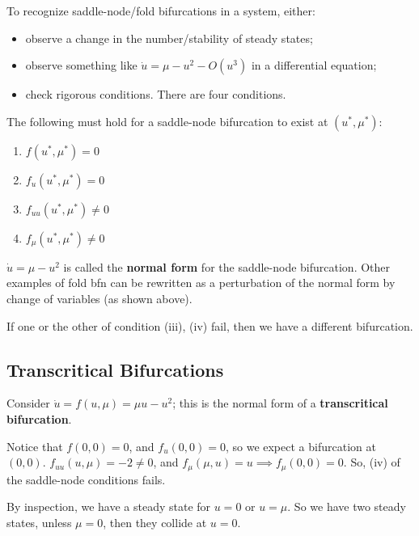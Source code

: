 \documentclass[12pt, oneside]{article}
\begin{document}
To recognize saddle-node/fold bifurcations in a system, either:

\begin{itemize}
  \item observe a change in the number/stability of steady states; %
  \item observe something like $\dot{u} = \mu - u^2 - O(u^3)$ in a differential equation;
  \item check rigorous conditions. There are four conditions.
\end{itemize}

\begin{definition}
  The following must hold for a saddle-node bifurcation to exist at $(u^*, \mu^*)$:
  \begin{enumerate}[label=\roman*)]
    \item $f(u^*, \mu^*) = 0$
    \item $f_u(u^*, \mu^*) = 0$
    \item $f_{uu}(u^*, \mu^*) \neq 0$
    \item $f_\mu(u^*, \mu^*) \neq 0$
  \end{enumerate}  
\end{definition}

\begin{remark}
  $\dot{u} = \mu - u^2$ is called the \textbf{normal form} for the saddle-node bifurcation. Other examples of fold bfn can be rewritten as a perturbation of the normal form by change of variables (as shown above).
\end{remark}

If one or the other of condition (iii), (iv) fail, then we have a different bifurcation.

\subsection{Transcritical Bifurcations}

Consider $\dot{u} = f(u,\mu) = \mu u - u^2$; this is the normal form of a \textbf{transcritical bifurcation}.

Notice that $f(0,0) = 0$, and $f_u(0,0) = 0$, so we expect a bifurcation at $(0,0)$. $f_{uu}(u, \mu) = -2 \neq 0$, and $f_{\mu}(\mu, u) = u \implies f_{\mu}(0,0) = 0$. So, (iv) of the saddle-node conditions fails.

By inspection, we have a steady state for $u = 0$ or $u = \mu$. So we have two steady states, unless $\mu = 0$, then they collide at $u = 0$.
\end{document}
